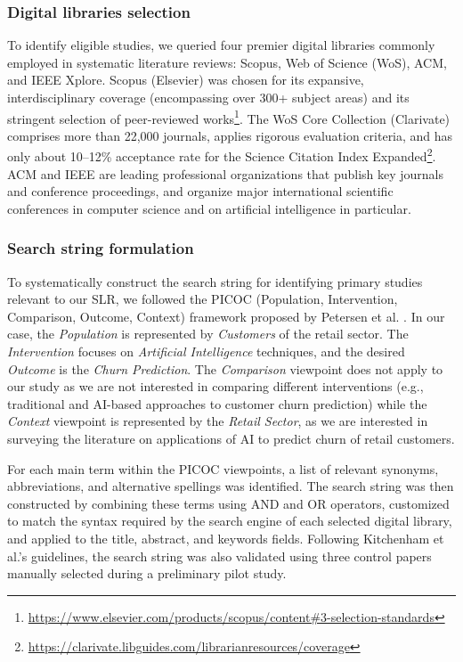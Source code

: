 \subsubsection{Digital libraries selection} 
To identify eligible studies, we queried four premier digital libraries commonly employed in systematic literature reviews: Scopus, Web of Science (WoS), ACM, and IEEE Xplore. Scopus (Elsevier) was chosen for its expansive, interdisciplinary coverage (encompassing over 300+ subject areas) and its stringent selection of peer-reviewed works\footnote{\url{https://www.elsevier.com/products/scopus/content\#3-selection-standards}}. The WoS Core Collection (Clarivate) comprises more than 22,000 journals, applies rigorous evaluation criteria, and has only about 10–12\% acceptance rate for the Science Citation Index Expanded\footnote{\url{https://clarivate.libguides.com/librarianresources/coverage}}. ACM and IEEE are leading professional organizations that publish key journals and conference proceedings, and organize major international scientific conferences in computer science and on artificial intelligence in particular.

\subsubsection{Search string formulation} 
To systematically construct the search string for identifying primary studies relevant to our SLR, we followed the PICOC (Population, Intervention, Comparison, Outcome, Context) framework proposed by Petersen et al. \cite{PETERSEN20151}. In our case, the \textit{Population} is represented by \textit{Customers} of the retail sector. The \textit{Intervention} focuses on \textit{Artificial Intelligence} techniques, and the desired \textit{Outcome} is the \textit{Churn Prediction}. The \textit{Comparison} viewpoint does not apply to our study as we are not interested in comparing different interventions (e.g., traditional and AI-based approaches to customer churn prediction) while the \textit{Context} viewpoint is represented by the \textit{Retail Sector}, as we are interested in surveying the literature on applications of AI to predict churn of retail customers.

For each main term within the PICOC viewpoints, a list of relevant synonyms, abbreviations, and alternative spellings was identified. The search string was then constructed by combining these terms using AND and OR operators, customized to match the syntax required by the search engine of each selected digital library, and applied to the title, abstract, and keywords fields.
Following Kitchenham et al.'s \cite{Kitchenham-Charters-guidelines} guidelines, the search string was also validated using three control papers \cite{S19-ID363-Agbemadon, S16-ID325-Matuszelanski, S11-D105-Sunarya} manually selected during a preliminary pilot study.

